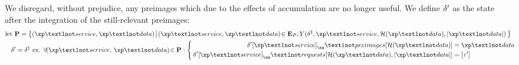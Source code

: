 We disregard, without prejudice, any preimages which due to the effects of accumulation are no longer useful. We define $\delta'$ as the state after the integration of the still-relevant preimages:
\begin{align}
  \using \mathbf{P} = \set{\build{
    \tup{\xp¬service, \xp¬data}
  }{
    \tup{\xp¬service, \xp¬data} \in \xtpreimages, Y(\accountspostxfer, \xp¬service, \blake{\xp¬data}, \len{\xp¬data})
  }}\\
  \accountspostpreimage = \accountspostxfer \text{ ex. } \forall \tup{\xp¬service,\,\xp¬data} \in \mathbf{P} : \abracegroup[\,]{
      \quad\accountspostpreimage\subb{\xp¬service}_\sa¬preimages\subb{\blake{\xp¬data}} &= \xp¬data \\
      \accountspostpreimage\subb{\xp¬service}_\sa¬requests\subb{\blake{\xp¬data}, \len{\xp¬data}} &= \sq{\thetime'}
    }\!\!\!\!
\end{align}
